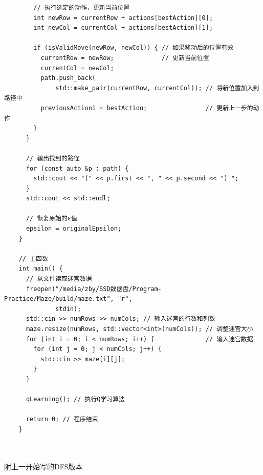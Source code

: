 \documentclass[UTF8,titlepage]{ctexart}
\numberwithin{figure}{section}
\begin{document}
\begin{verbatim}
        // 执行选定的动作，更新当前位置
        int newRow = currentRow + actions[bestAction][0];
        int newCol = currentCol + actions[bestAction][1];
    
        if (isValidMove(newRow, newCol)) { // 如果移动后的位置有效
          currentRow = newRow;             // 更新当前位置
          currentCol = newCol;
          path.push_back(
              std::make_pair(currentRow, currentCol)); // 将新位置加入到路径中
          previousAction1 = bestAction;                // 更新上一步的动作
        }
      }
    
      // 输出找到的路径
      for (const auto &p : path) {
        std::cout << "(" << p.first << ", " << p.second << ") ";
      }
      std::cout << std::endl;
    
      // 恢复原始的ε值
      epsilon = originalEpsilon;
    }
    
    // 主函数
    int main() {
      // 从文件读取迷宫数据
      freopen("/media/zby/SSD数据盘/Program-Practice/Maze/build/maze.txt", "r",
              stdin);
      std::cin >> numRows >> numCols; // 输入迷宫的行数和列数
      maze.resize(numRows, std::vector<int>(numCols)); // 调整迷宫大小
      for (int i = 0; i < numRows; i++) {              // 输入迷宫数据
        for (int j = 0; j < numCols; j++) {
          std::cin >> maze[i][j];
        }
      }
    
      qLearning(); // 执行Q学习算法
    
      return 0; // 程序结束
    }
    
    
\end{verbatim}

附上一开始写的DFS版本
\end{document}
